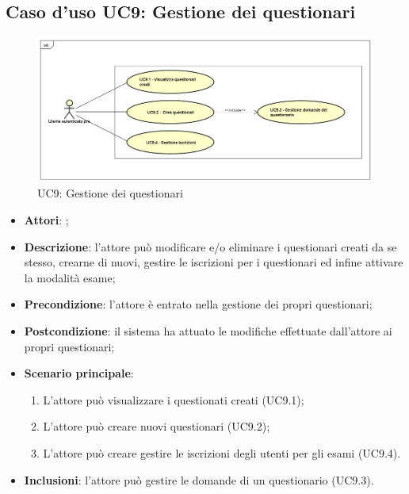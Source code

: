 \newpage
\subsection{Caso d'uso UC9: Gestione dei questionari}
\label{UC9}
\begin{figure}[h]
	\centering
	\includegraphics[scale=0.445,keepaspectratio]{UML/UC9.png}
	\caption{UC9: Gestione dei questionari}
\end{figure}
\FloatBarrier
\begin{itemize}
	\item \textbf{Attori}: \uaupro{};
	\item \textbf{Descrizione}: l'attore può modificare e/o eliminare i questionari creati da se stesso, crearne di nuovi, gestire le iscrizioni per i questionari ed infine attivare la modalità esame; 
	\item \textbf{Precondizione}: l'attore è entrato nella gestione dei propri questionari;
	\item \textbf{Postcondizione}: il sistema ha attuato le modifiche effettuate dall'attore ai propri questionari;
	\item \textbf{Scenario principale}:
		\begin{enumerate}
			\item L'attore può visualizzare i questionati creati (UC9.1);
			\item L'attore può creare nuovi questionari (UC9.2);
			\item L'attore può creare gestire le iscrizioni degli utenti per gli esami (UC9.4).
		\end{enumerate}
		\item \textbf{Inclusioni}: l'attore può gestire le domande di un questionario (UC9.3).		
\end{itemize}
							
